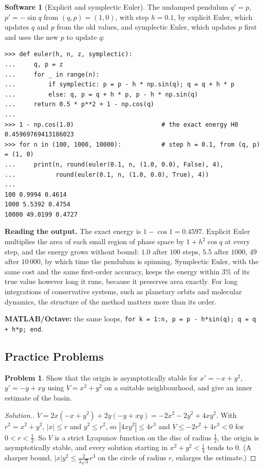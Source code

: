 \documentclass[11pt,a4paper]{article}
\numberwithin{equation}{section}
\theoremstyle{definition}
\newtheorem{software}[thm]{Software}
\newtheorem{problemx}{Problem}[subsection]
\newenvironment{problem}{\begin{problemx}}{\end{problemx}}
\newenvironment{solution}
  {\renewcommand{\qedsymbol}{}\begin{proof}[\textit{Solution}.]}
  {\end{proof}}
\begin{document}
\begin{software}[Explicit and symplectic Euler]
\label{sw:symplectic}
The undamped pendulum $q' = p$, $p' = -\sin q$ from $(q, p) = (1, 0)$, with step $h = 0.1$, by explicit Euler, which updates $q$ and $p$ from the old values, and symplectic Euler, which updates $p$ first and uses the new
$p$ to update $q$:
{\small\begin{verbatim}
>>> def euler(h, n, z, symplectic):
...     q, p = z
...     for _ in range(n):
...         if symplectic: p = p - h * np.sin(q); q = q + h * p
...         else: q, p = q + h * p, p - h * np.sin(q)
...     return 0.5 * p**2 + 1 - np.cos(q)
...
>>> 1 - np.cos(1.0)                        # the exact energy H0
0.45969769413186023
>>> for n in (100, 1000, 10000):           # step h = 0.1, from (q, p) = (1, 0)
...     print(n, round(euler(0.1, n, (1.0, 0.0), False), 4),
...           round(euler(0.1, n, (1.0, 0.0), True), 4))
...
100 0.9994 0.4614
1000 5.5392 0.4754
10000 49.0199 0.4727
\end{verbatim}}
\textbf{Reading the output.} The exact energy is $1 - \cos1 = 0.4597$. Explicit Euler multiplies the area of each small region of phase space by $1 + h^2\cos q$ at every step, and the energy grows without bound:
$1.0$ after $100$ steps, $5.5$ after $1000$, $49$ after $10\,000$, by which time the pendulum is spinning. Symplectic Euler, with the same cost and the same first-order accuracy, keeps the energy within $3\%$ of
its true value however long it runs, because it preserves area exactly. For long integrations of conservative systems, such as planetary orbits and molecular dynamics, the structure of
the method matters more than its order.

\textbf{MATLAB/Octave:} the same loops, \texttt{for k = 1:n, p = p - h*sin(q); q = q + h*p; end}.
\end{software}

\subsection{Practice Problems}

\begin{problem}
Show that the origin is asymptotically stable for $x' = -x + y^2$, $y' = -y + xy$ using $V = x^2 + y^2$ on a suitable neighbourhood, and give an inner estimate of the basin.
\end{problem}

\begin{solution}
$\dot V = 2x(-x + y^2) + 2y(-y + xy) = -2x^2 - 2y^2 + 4xy^2$. With $r^2 = x^2 + y^2$, $|x| \leq r$ and $y^2 \leq r^2$, so $|4xy^2| \leq 4r^3$ and $\dot V \leq -2r^2 + 4r^3 < 0$ for $0 < r < \frac12$. So $V$ is a strict
Lyapunov function on the disc of radius $\frac12$, the origin is asymptotically stable, and every solution starting in $x^2 + y^2 < \frac14$ tends to $0$. (A sharper bound, $|x|y^2 \leq \frac{2}{3\sqrt3}r^3$ on the circle
of radius $r$, enlarges the estimate.)
\end{solution}
\end{document}
